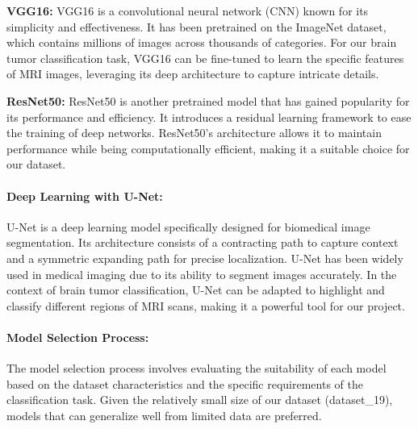 \textbf{VGG16:} VGG16 is a convolutional neural network (CNN) known for its simplicity and effectiveness. It has been pretrained on the ImageNet dataset, which contains millions of images across thousands of categories. For our brain tumor classification task, VGG16 can be fine-tuned to learn the specific features of MRI images, leveraging its deep architecture to capture intricate details.

\textbf{ResNet50:} ResNet50 is another pretrained model that has gained popularity for its performance and efficiency. It introduces a residual learning framework to ease the training of deep networks. ResNet50's architecture allows it to maintain performance while being computationally efficient, making it a suitable choice for our dataset.

\paragraph{Deep Learning with U-Net:}
U-Net is a deep learning model specifically designed for biomedical image segmentation. Its architecture consists of a contracting path to capture context and a symmetric expanding path for precise localization. U-Net has been widely used in medical imaging due to its ability to segment images accurately. In the context of brain tumor classification, U-Net can be adapted to highlight and classify different regions of MRI scans, making it a powerful tool for our project.

\paragraph{Model Selection Process:}
The model selection process involves evaluating the suitability of each model based on the dataset characteristics and the specific requirements of the classification task. Given the relatively small size of our dataset (dataset\_19), models that can generalize well from limited data are preferred. 


